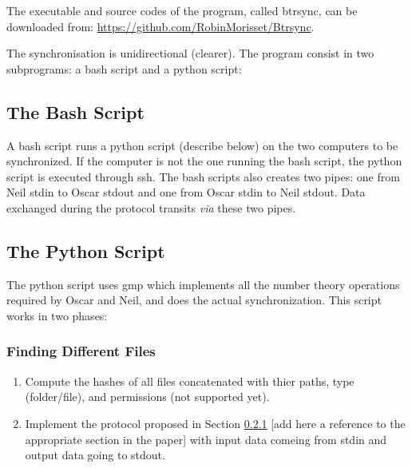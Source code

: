 \documentclass[11pt]{llncs}
\begin{document}
The executable and source codes of the program, called {\sf btrsync}, can be downloaded from: \url{https://github.com/RobinMorisset/Btrsync}.\smallskip

The synchronisation is unidirectional (clearer). The program consist in two subprograms: a bash script and a python script:

\subsection{The Bash Script}

A bash script runs a python script (describe below) on the two computers to be synchronized. If the computer is not the one running the bash script, the python script is executed through ssh. The bash scripts also creates two pipes: one from Neil stdin to Oscar stdout and one from Oscar stdin to Neil stdout. Data exchanged during the protocol transits {\sl via} these two pipes.

\subsection{The Python Script}

The python script uses gmp which implements all the number theory operations required by Oscar and Neil, and does the actual synchronization. This script works in two phases:

\subsubsection{Finding Different Files}

\begin{enumerate}
\item Compute the hashes of all files concatenated with thier paths, type (folder/file), and permissions (not supported yet).
\item Implement the protocol proposed in Section \ref{} [add here a reference to the appropriate section in the paper] with input data comeing from stdin and output data going to stdout.
\end{enumerate}
\end{document}
